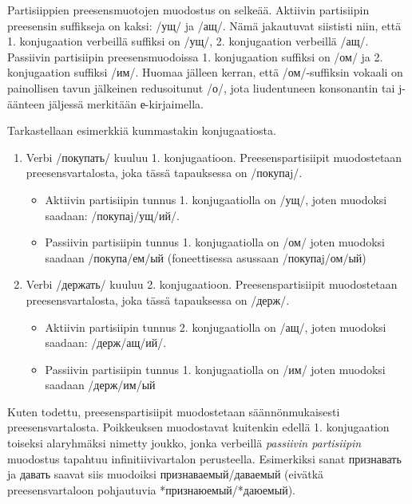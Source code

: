 \documentclass[]{scrartcl}
\providecommand{\tightlist}{%
  \setlength{\itemsep}{0pt}\setlength{\parskip}{0pt}}
\begin{document}
Partisiippien preesensmuotojen muodostus on selkeää. Aktiivin
partisiipin preesensin suffikseja on kaksi: /ущ/ ja /ащ/. Nämä
jakautuvat siististi niin, että 1. konjugaation verbeillä suffiksi on
/ущ/, 2. konjugaation verbeillä /ащ/. Passiivin partisiipin
preesensmuodoissa 1. konjugaation suffiksi on /ом/ ja 2. konjugaation
suffiksi /им/. Huomaa jälleen kerran, että /ом/-suffiksin vokaali on
painollisen tavun jälkeinen redusoitunut /о/, jota liudentuneen
konsonantin tai j-äänteen jäljessä merkitään е-kirjaimella.

Tarkastellaan esimerkkiä kummastakin konjugaatiosta.

\begin{enumerate}
\def\labelenumi{\alph{enumi})}
\tightlist
\item
  Verbi /покупать/ kuuluu 1. konjugaatioon. Preesenspartisiipit
  muodostetaan preesensvartalosta, joka tässä tapauksessa on /покупаj/.

  \begin{itemize}
  \tightlist
  \item
    Aktiivin partisiipin tunnus 1. konjugaatiolla on /ущ/, joten
    muodoksi saadaan: /покупаj/ущ/ий/.
  \item
    Passiivin partisiipin tunnus 1. konjugaatiolla on /ом/ joten
    muodoksi saadaan /покупа/ем/ый (foneettisessa asussaan
    /покупаj/ом/ый)
  \end{itemize}
\item
  Verbi /держать/ kuuluu 2. konjugaatioon. Preesenspartisiipit
  muodostetaan preesensvartalosta, joka tässä tapauksessa on /держ/.

  \begin{itemize}
  \tightlist
  \item
    Aktiivin partisiipin tunnus 2. konjugaatiolla on /ащ/, joten
    muodoksi saadaan: /держ/ащ/ий/.
  \item
    Passiivin partisiipin tunnus 1. konjugaatiolla on /им/ joten
    muodoksi saadaan /держ/им/ый
  \end{itemize}
\end{enumerate}

Kuten todettu, preesenspartisiipit muodostetaan säännönmukaisesti
preesensvartalosta. Poikkeuksen muodostavat kuitenkin edellä 1.
konjugaation toiseksi alaryhmäksi nimetty joukko, jonka verbeillä
\emph{passiivin partisiipin} muodostus tapahtuu infinitiivivartalon
perusteella. Esimerkiksi sanat признавать ja давать saavat siis
muodoiksi признаваемый/даваемый (eivätkä preesensvartaloon pohjautuvia
*признаюемый/*даюемый).
\end{document}
